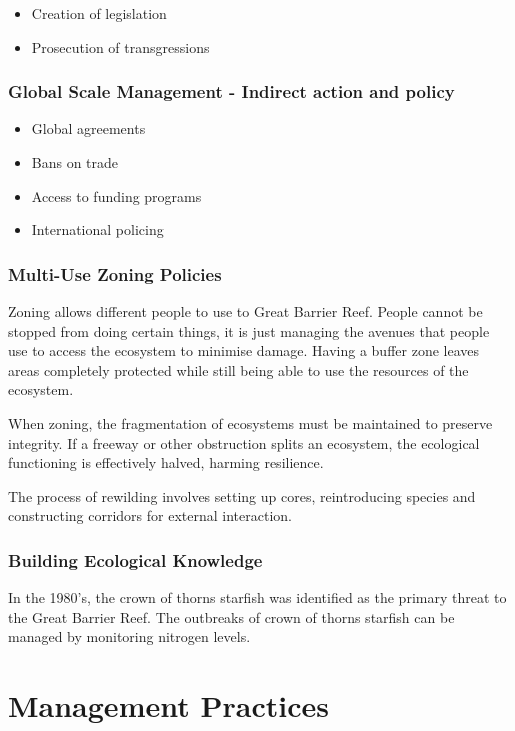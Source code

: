 			\begin{itemize}
				\item Creation of legislation
				\item Prosecution of transgressions
			\end{itemize}

		\subsubsection{Global Scale Management - Indirect action and policy}
		
			\begin{itemize}
				\item Global agreements
				\item Bans on trade
				\item Access to funding programs
				\item International policing
			\end{itemize}

		\subsubsection{Multi-Use Zoning Policies}

			Zoning allows different people to use to Great Barrier Reef. People cannot be stopped from doing certain things, it is just managing the avenues that people use to access the ecosystem to minimise damage. Having a buffer zone leaves areas completely protected while still being able to use the resources of the ecosystem.

			When zoning, the fragmentation of ecosystems must be maintained to preserve integrity. If a freeway or other obstruction splits an ecosystem, the ecological functioning is effectively halved, harming resilience.

			The process of rewilding involves setting up cores, reintroducing species and constructing corridors for external interaction.

		\subsubsection{Building Ecological Knowledge}
		
			In the 1980's, the crown of thorns starfish was identified as the primary threat to the Great Barrier Reef. The outbreaks of crown of thorns starfish can be managed by monitoring nitrogen levels.


\section{Management Practices} \label{27/05/2025}
	
